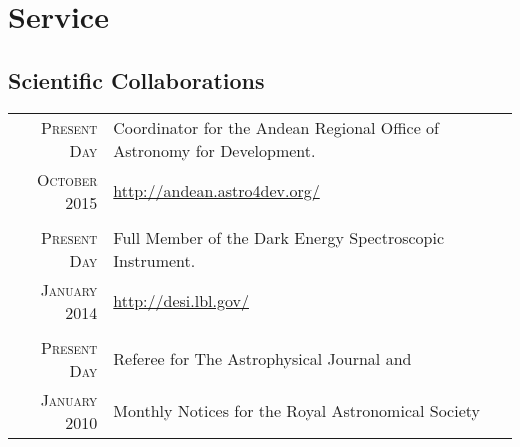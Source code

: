\documentclass[a4paper,10pt]{article} %
\begin{document}


\newpage
\color{red}
\section{Service}
\color{black}
\subsection{Scientific Collaborations}

\begin{tabular}{rl}	
 \textsc{Present Day} &  Coordinator for the Andean Regional Office of  Astronomy for Development.\\
 \textsc{October 2015} & \url{http://andean.astro4dev.org/}\\
& \\
 \textsc{Present Day} &  Full Member of the Dark Energy Spectroscopic Instrument.\\
 \textsc{January 2014} & \url{http://desi.lbl.gov/}\\
& \\ 
\textsc{Present Day} & Referee for The Astrophysical Journal and \\
\textsc{January 2010} & Monthly Notices for the Royal Astronomical
Society\\
\end{tabular}
\end{document}
